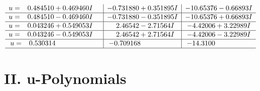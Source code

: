 \documentclass[1p]{elsarticle_modified}
\theoremstyle{definition}
\begin{document}
$$\begin{array}{c|c|c}
\begin{aligned}
u &= \phantom{-}0.484510 + 0.469460 I\end{aligned}
 & -0.731880 + 0.351895 I & -10.65376 - 0.66893 I \\ \hline\begin{aligned}
u &= \phantom{-}0.484510 - 0.469460 I\end{aligned}
 & -0.731880 - 0.351895 I & -10.65376 + 0.66893 I \\ \hline\begin{aligned}
u &= \phantom{-}0.043246 + 0.549053 I\end{aligned}
 & \phantom{-}2.46542 - 2.71564 I & -4.42006 + 3.22989 I \\ \hline\begin{aligned}
u &= \phantom{-}0.043246 - 0.549053 I\end{aligned}
 & \phantom{-}2.46542 + 2.71564 I & -4.42006 - 3.22989 I \\ \hline\begin{aligned}
u &= \phantom{-}0.530314\phantom{ +0.000000I}\end{aligned}
 & -0.709168\phantom{ +0.000000I} & -14.3100\phantom{ +0.000000I}\\
 \hline 
 \end{array}$$\newpage
\newpage\renewcommand{\arraystretch}{1}
\centering \section*{ II. u-Polynomials}
\end{document}
